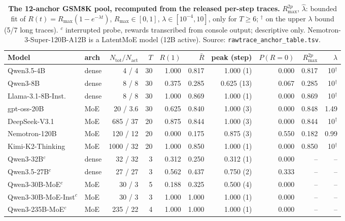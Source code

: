 \begin{table}[t]
  \centering
  \small
  \setlength{\tabcolsep}{3.5pt}
  \begin{tabular}{llrrrrrrrr}
    \toprule
    Model & arch & $N_{\text{tot}}/N_{\text{act}}$ & $T$ & $R(1)$ & $\bar R$ &
      peak (step) & $P(R{=}0)$ & $R_{\max}^{2p}$ & $\hat\lambda$ \\
    \midrule
    Qwen3.5-4B            & dense & 4 / 4       & 30 & 1.000 & 0.817 & 1.000 (1)  & 0.000 & 0.817 & 10$^{\dagger}$ \\
    Qwen3-8B              & dense & 8 / 8       & 30 & 0.375 & 0.285 & 0.625 (13) & 0.067 & 0.285 & 10$^{\dagger}$ \\
    Llama-3.1-8B-Inst.    & dense & 8 / 8       & 30 & 1.000 & 0.869 & 1.000 (1)  & 0.000 & 0.869 & 10$^{\dagger}$ \\
    gpt-oss-20B           & MoE   & 20 / 3.6    & 30 & 0.625 & 0.840 & 1.000 (3)  & 0.000 & 0.848 & 1.49 \\
    DeepSeek-V3.1         & MoE   & 685 / 37    & 20 & 0.875 & 0.844 & 1.000 (3)  & 0.000 & 0.844 & 10$^{\dagger}$ \\
    Nemotron-120B         & MoE   & 120 / 12    & 20 & 0.000 & 0.175 & 0.875 (3)  & 0.550 & 0.182 & 0.99 \\
    Kimi-K2-Thinking      & MoE   & 1000 / 32   & 20 & 1.000 & 0.850 & 1.000 (1)  & 0.000 & 0.850 & 10$^{\dagger}$ \\
    \midrule
    Qwen3-32B$^{c}$       & dense & 32 / 32     & 3  & 0.312 & 0.250 & 0.312 (1)  & 0.000 & -- & -- \\
    Qwen3.5-27B$^{c}$     & dense & 27 / 27     & 3  & 0.562 & 0.437 & 0.750 (2)  & 0.333 & -- & -- \\
    Qwen3-30B-MoE$^{c}$   & MoE   & 30 / 3      & 5  & 0.188 & 0.325 & 0.500 (4)  & 0.000 & -- & -- \\
    Qwen3-30B-MoE-Inst$^{c}$ & MoE & 30 / 3     & 3  & 1.000 & 1.000 & 1.000 (1)  & 0.000 & -- & -- \\
    Qwen3-235B-MoE$^{c}$  & MoE   & 235 / 22    & 4  & 1.000 & 1.000 & 1.000 (1)  & 0.000 & -- & -- \\
    \bottomrule
  \end{tabular}
  \caption{\textbf{The 12-anchor GSM8K pool, recomputed from the
    released per-step traces.}  $R_{\max}^{2p}$, $\hat\lambda$: bounded
    fit of $R(t)=R_{\max}(1-e^{-\lambda t})$, $R_{\max}\in[0,1]$,
    $\lambda\in[10^{-4},10]$, only for $T \ge 6$; $^{\dagger}$ on the
    upper $\lambda$ bound (5/7 long traces).  $^{c}$ interrupted probe,
    rewards transcribed from console output; descriptive only.
    Nemotron-3-Super-120B-A12B is a LatentMoE model (12B active).
    Source: \texttt{rawtrace\_anchor\_table.tsv}.}
  \label{tab:p1-rawtrace}
\end{table}

